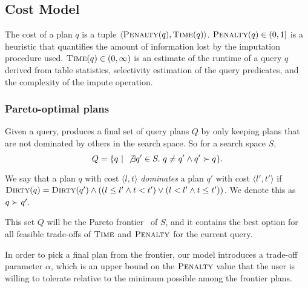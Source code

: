\subsection{Cost Model}
\label{sec:cost-model}
The cost of a plan $q$ is a tuple $\langle \textsc{Penalty}(q), \textsc{Time}(q) \rangle$.
$\textsc{Penalty}(q) \in (0,1]$ is a heuristic that quantifies the amount of information lost by the imputation procedure used.
$\textsc{Time}(q) \in (0, \infty)$ is an estimate of the runtime of a query $q$ derived from table statistics, selectivity estimation of the query predicates, and the complexity of the
impute operation. 

\subsubsection{Pareto-optimal plans}\label{subsubsec:pareto}
Given a query, \ProjectName{} produces a final set of query plans $Q$ by only keeping plans that are not dominated by others in the search space. So for a search space $S$, \[Q= \{ q ~|~ \not\exists q' \in S.\ q \neq q' \land q' \succ q \}.\]

\begin{definition}
We say that a plan $q$ with cost $\langle l, t \rangle$ \emph{dominates} a plan $q'$ with cost $\langle l', t' \rangle$ if $\textsc{Dirty}(q) = \textsc{Dirty}(q') \land ((l \leq l' \land t < t') \lor (l < l' \land t \leq t'))$. We denote this as $q \succ q'$. 
\end{definition}

This set $Q$ will be the Pareto frontier~\cite{pareto1964cours} of $S$, and it contains the best option for all feasible trade-offs of $\textsc{Time}$ and $\textsc{Penalty}$ for the current query. 

In order to pick a final plan from the frontier, our model introduces a trade-off parameter $\alpha$, which is an upper bound on the $\textsc{Penalty}$ value that the user is willing
to tolerate relative to the minimum possible among the frontier plans.


